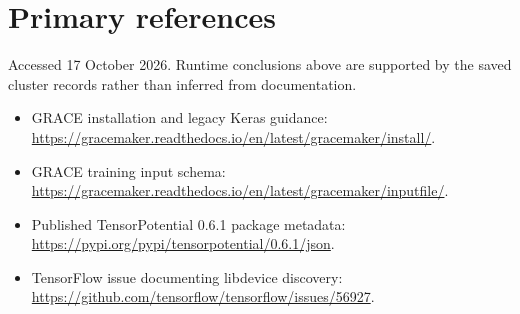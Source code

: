 \documentclass[10pt,a4paper]{article}
\begin{document}
\section{Primary references}
Accessed 17 October 2026. Runtime conclusions above are supported by the saved
cluster records rather than inferred from documentation.
\begin{itemize}
\item GRACE installation and legacy Keras guidance:
\url{https://gracemaker.readthedocs.io/en/latest/gracemaker/install/}.
\item GRACE training input schema:
\url{https://gracemaker.readthedocs.io/en/latest/gracemaker/inputfile/}.
\item Published TensorPotential 0.6.1 package metadata:
\url{https://pypi.org/pypi/tensorpotential/0.6.1/json}.
\item TensorFlow issue documenting libdevice discovery:
\url{https://github.com/tensorflow/tensorflow/issues/56927}.
\end{itemize}
\end{document}
